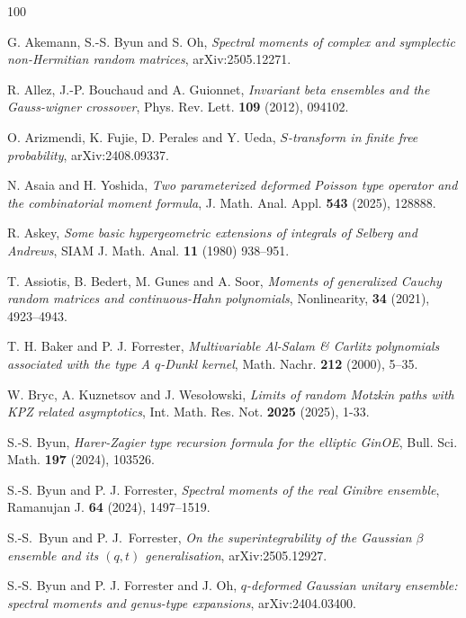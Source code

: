 \documentclass{amsart}
\theoremstyle{plain}
\theoremstyle{remark}
\numberwithin{equation}{section}
\begin{document}
 
\begin{thebibliography}{100}
  

 G. Akemann, S.-S. Byun and S. Oh, \emph{Spectral moments of complex and symplectic non-Hermitian random matrices}, arXiv:2505.12271. 
 
 R. Allez, J.-P. Bouchaud and A. Guionnet, \emph{Invariant beta ensembles and the Gauss-wigner crossover}, Phys. Rev. Lett. \textbf{109} (2012), 094102. 

 O. Arizmendi, K. Fujie, D. Perales and Y. Ueda, \emph{$S$-transform in finite free probability}, arXiv:2408.09337.

 N. Asaia and H. Yoshida, \textit{Two parameterized deformed Poisson type operator and the combinatorial moment formula}, J. Math. Anal. Appl. \textbf{543} (2025), 128888.

 R. Askey, \emph{Some basic hypergeometric extensions of integrals of Selberg and Andrews}, SIAM J. Math. Anal. \textbf{11} (1980) 938--951.

 T. Assiotis, B. Bedert, M. Gunes and A. Soor, \emph{Moments of generalized Cauchy random matrices and continuous-Hahn polynomials}, Nonlinearity, \textbf{34} (2021), 4923--4943.

 T. H. Baker and P. J. Forrester, \emph{Multivariable Al-Salam \& Carlitz polynomials associated with the type A $q$-Dunkl kernel}, Math. Nachr. \textbf{212} (2000), 5--35.
 
 W. Bryc, A. Kuznetsov and J. Wesołowski, \emph{Limits of random Motzkin paths with KPZ related asymptotics}, Int. Math. Res. Not. \textbf{2025} (2025), 1-33. 

 S.-S. Byun, \emph{Harer-Zagier type recursion formula for the elliptic GinOE}, Bull. Sci. Math. \textbf{197} (2024), 103526. 

 S.-S. Byun and P. J. Forrester, \emph{Spectral moments of the real Ginibre ensemble}, Ramanujan J. \textbf{64} (2024), 1497--1519.
 
 S.-S.~Byun and P. J.~Forrester, \emph{On the superintegrability of the Gaussian $\beta$ ensemble and its $(q,t)$ generalisation}, arXiv:2505.12927.

 S.-S. Byun and P. J. Forrester and J. Oh, \emph{$q$-deformed Gaussian unitary ensemble: spectral moments and genus-type expansions}, arXiv:2404.03400.
 

\end{thebibliography}
\end{document}

